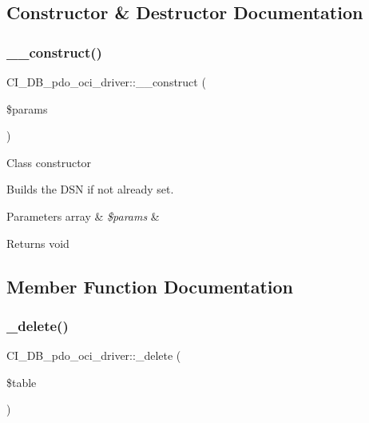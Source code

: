 \subsection{Constructor \& Destructor Documentation}
\mbox{\label{class_c_i___d_b__pdo__oci__driver_ac0ed6288a6c9edf3c3671795d8257b55}} 
\subsubsection{\texorpdfstring{\+\_\+\+\_\+construct()}{\_\_construct()}}
{\footnotesize\ttfamily C\+I\+\_\+\+D\+B\+\_\+pdo\+\_\+oci\+\_\+driver\+::\+\_\+\+\_\+construct (\begin{DoxyParamCaption}\item[{}]{\$params }\end{DoxyParamCaption})}

Class constructor

Builds the D\+SN if not already set.


\begin{DoxyParams}[1]{Parameters}
array & {\em \$params} & \\
\hline
\end{DoxyParams}
\begin{DoxyReturn}{Returns}
void 
\end{DoxyReturn}


\subsection{Member Function Documentation}
\mbox{\label{class_c_i___d_b__pdo__oci__driver_a94af30bb33c14525c6d52ca09712ac3d}} 
\subsubsection{\texorpdfstring{\+\_\+delete()}{\_delete()}}
{\footnotesize\ttfamily C\+I\+\_\+\+D\+B\+\_\+pdo\+\_\+oci\+\_\+driver\+::\+\_\+delete (\begin{DoxyParamCaption}\item[{}]{\$table }\end{DoxyParamCaption})\hspace{0.3cm}{\ttfamily [protected]}}

